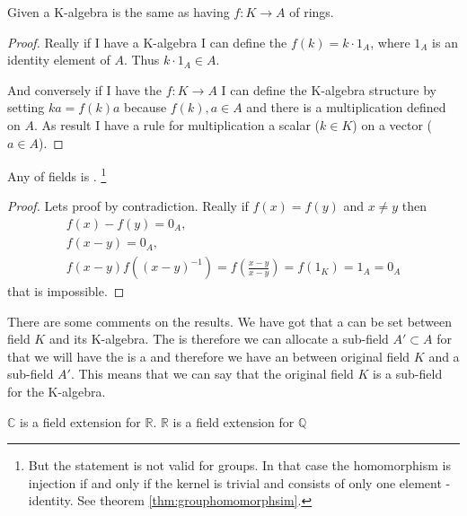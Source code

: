 \begin{lemma}
Given a K-algebra is the same as
having  $f: K \rightarrow A$ of rings.
\begin{proof}
Really if I have a K-algebra I can define the
 $f(k) = k \cdot 1_A$, where $1_A$ is an
identity element of $A$. Thus $k \cdot 1_A \in A$.

And conversely if I have the 
$f: K \rightarrow A$
I can define the K-algebra structure by setting
$k a = f(k) a$ because $f(k), a \in A$ and there is a multiplication
defined on $A$. As result I have a rule for multiplication a scalar
($k \in K$) on a vector ($a \in A$).
\end{proof}
\label{lem:lec1_homkalgebra}
\end{lemma}

\begin{lemma}
Any  of fields is
.
\footnote{
  But the statement is not valid for groups. In that case the
  homomorphism is injection if and only if the 
  kernel is trivial and consists of only one element - identity.
  See theorem \ref{thm:grouphomomorphsim}.
}
\begin{proof}
Lets proof by contradiction.
Really if $f(x) = f(y)$ and $x \ne y$ then
\begin{eqnarray}
  f(x) - f(y) = 0_A,
  \nonumber \\
  f(x - y) = 0_A,
  \nonumber \\
  f(x - y) f(\left(x - y\right)^{-1}) =
  f\left(\frac{x - y}{x - y}\right) = f(1_K) = 1_A = 0_A
  \nonumber
\end{eqnarray}
that is impossible.
\end{proof}
\label{lem:lec1_homomorphism_is_injection}
\end{lemma}

There are some comments on the results. We have got that a
 can be set between field $K$ and its
K-algebra.
The  is 
therefore we can allocate a sub-field $A' \subset A$ for that we will
have the  is a  and
therefore we have an  between original field $K$
and a sub-field $A'$. This means that we can say that the original
field $K$ is a sub-field for the K-algebra.

\begin{example}
  $\mathbb{C}$ is a field extension for $\mathbb{R}$.
  $\mathbb{R}$ is a field extension for $\mathbb{Q}$
  \label{ex:fieldextension}
\end{example}


